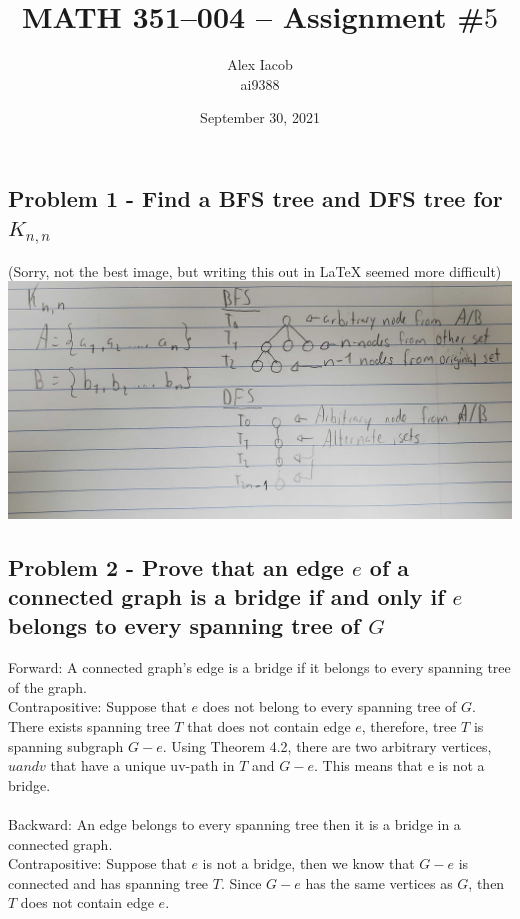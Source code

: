 \documentclass[10pt,a4paper]{article}
\title{MATH 351--004 -- Assignment \#$5$\\
}
\author{Alex Iacob\\
ai9388}
\date{September 30, 2021}
\begin{document}
\maketitle


\subsection*{Problem 1 -  Find a BFS tree and DFS tree for $K_{n, n}$}
(Sorry, not the best image, but writing this out in LaTeX seemed more difficult)\\
\includegraphics[width = 15 cm]{question1}

\subsection*{Problem 2 - Prove that an edge $e$ of a connected graph is a bridge if and only if $e$ belongs to every spanning tree of $G$}

Forward: A connected graph's edge is a bridge if it belongs to every spanning tree of the graph.\\
Contrapositive: Suppose that $e$ does not belong to every spanning tree of $G$. There exists spanning tree $T$ that does not contain edge $e$, therefore, tree $T$ is spanning subgraph $G - e$. Using Theorem 4.2, there are two arbitrary vertices, $u and v$ that have a unique uv-path in $T$ and $G - e$. This means that e is not a bridge.\\\\
Backward: An edge belongs to every spanning tree then it is a bridge in a connected graph.\\
Contrapositive: Suppose that $e$ is not a bridge, then we know that $G - e$ is connected and has spanning tree $T$. Since $G - e$ has the same vertices as $G$, then $T$ does not contain edge $e$.
\end{document}
